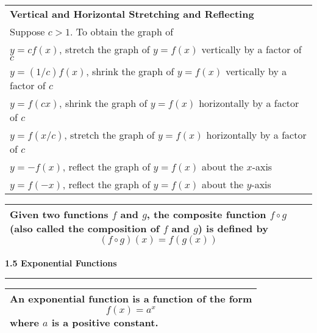 \documentclass[fleqn]{article}
\begin{document}
\begin{center}
\def\arraystretch{1.3}
{\setlength{\tabcolsep}{16pt}
\begin{tabularx}{.9\textwidth}{|X|}
\hline
	\vspace{1pt}
	\textbf{Vertical and Horizontal Stretching and Reflecting} \\[6pt]
	\hspace{12pt} Suppose $c>1$. To obtain the graph of \\[6pt]
	\hspace{12pt} $y = cf(x)$, stretch the graph of $y = f(x)$ vertically by a factor of $c$ \\[3pt]
	\hspace{12pt} $y = (1/c)f(x)$, shrink the graph of $y = f(x)$ vertically by a factor of $c$ \\[3pt]
	\hspace{12pt} $y = f(cx)$, shrink the graph of $y = f(x)$ horizontally by a factor of $c$ \\[3pt]
	\hspace{12pt} $y = f(x/c)$, stretch the graph of $y = f(x)$ horizontally by a factor of $c$ \\[3pt]
	\hspace{12pt} $y = -f(x)$, reflect the graph of $y = f(x)$ about the $x$-axis \\[3pt]
	\hspace{12pt} $y = f(-x)$, reflect the graph of $y = f(x)$ about the $y$-axis \\[12pt]	
\hline
\end{tabularx}}
\vspace{12pt}

\def\arraystretch{1.3}
{\setlength{\tabcolsep}{16pt}
\begin{tabularx}{.9\textwidth}{|X|}
\hline
	\vspace{3pt}
	Given two functions $f$ and $g$, the \textbf{composite function} $f \circ g$ (also called the \textbf{composition} of $f$ and $g$) is defined by
	$$(f \circ g)(x) = f(g(x))$$ 
	\\
\hline
\end{tabularx}}
\vspace{32pt}

\Large\textbf{1.5 Exponential Functions}

\noindent\hfill\rule{0.3\textwidth}{.4pt}\hfill
\vspace{12pt}

\large
\def\arraystretch{1.3}
{\setlength{\tabcolsep}{16pt}
\begin{tabularx}{.9\textwidth}{|X|}
\hline
	\vspace{1pt}
	An \textbf{exponential function} is a function of the form
	$$f(x) = a^x$$
	where $a$ is a positive constant. \\[12pt]	
\hline
\end{tabularx}}
\vspace{12pt}


\end{center}
\end{document}
